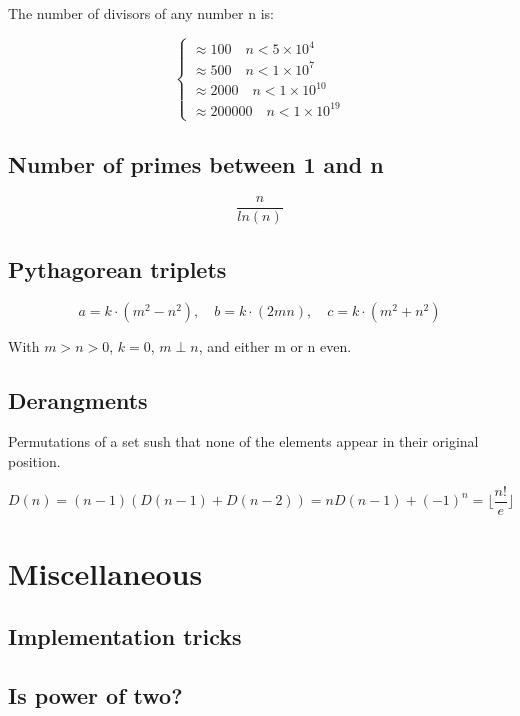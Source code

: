\documentclass[10pt]{article}
\begin{document}
\begin{multicols*}{2}
The number of divisors of any number n is:

\[
\begin{cases}
    \approx 100 \quad n< 5 \times 10^4 \\
    \approx 500 \quad n<1 \times 10^7 \\
    \approx 2000 \quad n < 1 \times 10^10 \\
    \approx 200000 \quad n < 1 \times 10^19
\end{cases}
\]

\subsection{Number of primes between 1 and n}

\[
\frac{n}{ln(n)}
\]


\subsection{Pythagorean triplets}

\[
a = k \cdot (m^2 - n^2), \quad b = k\cdot(2mn), \quad c = k\cdot(m^2+n^2)
\]

With $m>n>0$, $k=0$, $m\perp n$, and either m or n even.


\subsection{Derangments}

Permutations of a set sush that none of the elements appear in their original position.

\[
D(n) = (n-1)(D(n-1)+D(n-2)) = nD(n-1)+(-1)^n = \lfloor \frac{n!}{e}\rfloor
\]


\section{Miscellaneous}

\subsection{Implementation tricks}


\subsection{Is power of two?}



\end{multicols*}
\end{document}
